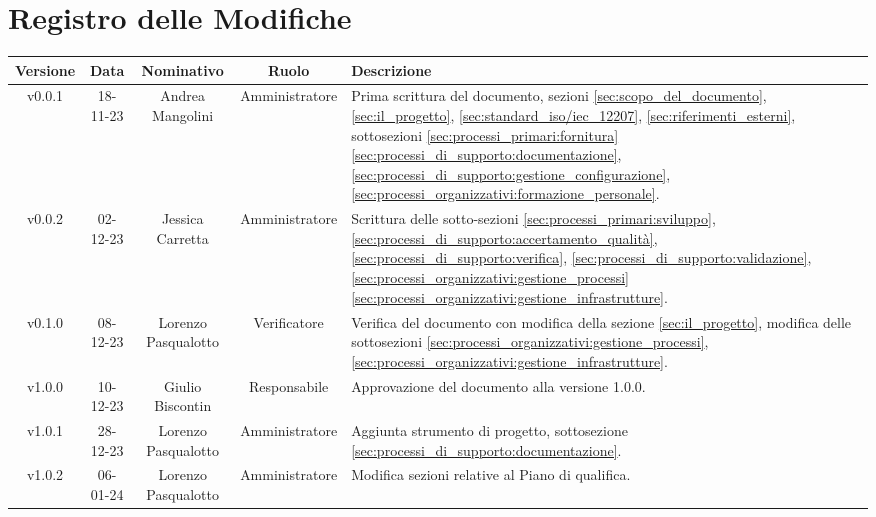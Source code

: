 \section*{\Large Registro delle Modifiche}
\begin{table}[h]
    \centering
    \renewcommand\tabularxcolumn[1]{m{#1}} %
    \renewcommand{\arraystretch}{1.5}
    \begin{tabularx}{0.98\textwidth}
        {c|c|c|c|>{\centering\arraybackslash}X}
        \rowcolor{black}
        \textbf{\color{white} Versione} & \textbf{\color{white} Data} & \textbf{\color{white} Nominativo} & \textbf{\color{white} Ruolo} & \textbf{\color{white} Descrizione} \\ 
        \hline

        v0.0.1 & 18-11-23 & Andrea Mangolini & Amministratore & Prima scrittura del documento, sezioni \ref{sec:scopo_del_documento}, \ref{sec:il_progetto}, 
        \ref{sec:standard_iso/iec_12207}, \ref{sec:riferimenti_esterni}, sottosezioni 
        \ref{sec:processi_primari:fornitura} \ref{sec:processi_di_supporto:documentazione}, 
        \ref{sec:processi_di_supporto:gestione_configurazione}, 
        \ref{sec:processi_organizzativi:formazione_personale}. \\
        v0.0.2 & 02-12-23 & Jessica Carretta & Amministratore & Scrittura delle sotto-sezioni \ref{sec:processi_primari:sviluppo}, 
        \ref{sec:processi_di_supporto:accertamento_qualità}, \ref{sec:processi_di_supporto:verifica}, 
        \ref{sec:processi_di_supporto:validazione}, \ref{sec:processi_organizzativi:gestione_processi} 
        \ref{sec:processi_organizzativi:gestione_infrastrutture}. \\
        v0.1.0 & 08-12-23 & Lorenzo Pasqualotto & Verificatore & Verifica del documento con modifica della sezione \ref{sec:il_progetto}, modifica delle sottosezioni \ref{sec:processi_organizzativi:gestione_processi}, \ref{sec:processi_organizzativi:gestione_infrastrutture}.\\
        v1.0.0 & 10-12-23 & Giulio Biscontin & Responsabile & Approvazione del documento alla versione 1.0.0.\\
        v1.0.1 & 28-12-23 & Lorenzo Pasqualotto & Amministratore & Aggiunta strumento di progetto, sottosezione \ref{sec:processi_di_supporto:documentazione}.\\
        v1.0.2 & 06-01-24 & Lorenzo Pasqualotto & Amministratore & Modifica sezioni relative al Piano di qualifica.\\

\end{tabularx}
\end{table}
